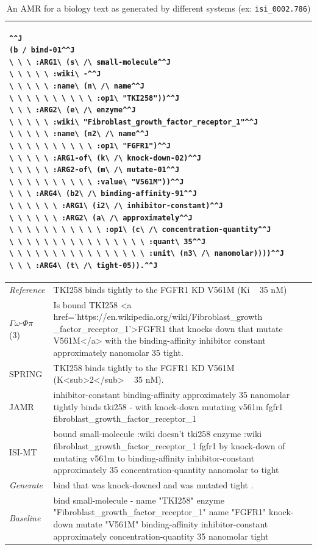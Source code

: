 \documentclass[12pt]{article}
\newcommand{\systeme}[1]{\textsc{#1}}
\newcommand{\gophipy}{$\Gamma\omega$-$\Phi\pi$}
\newcommand{\jamr}{\systeme{JAMR}}
\newcommand{\isimt}{\systeme{ISI-MT}}
\newcommand{\spring}{\systeme{SPRING}}
\newcommand{\representation}[1]{\textsf{#1}}
\newcommand{\AMR}{\representation{AMR}}
\begin{document}
\noindent
\begin{table}[ht]
\begin{tabular}{|p{1in}|p{5.25in}|}%
\hline
\multicolumn{2}{|p{6in}|}{
\begin{lstlisting}^^J
(b / bind-01^^J
\ \ \ :ARG1\ (s\ /\ small-molecule^^J
\ \ \ \ \ :wiki\ -^^J
\ \ \ \ \ :name\ (n\ /\ name^^J
\ \ \ \ \ \ \ \ \ \ :op1\ "TKI258"))^^J
\ \ \ :ARG2\ (e\ /\ enzyme^^J
\ \ \ \ \ :wiki\ "Fibroblast_growth_factor_receptor_1"^^J
\ \ \ \ \ :name\ (n2\ /\ name^^J
\ \ \ \ \ \ \ \ \ \ :op1\ "FGFR1")^^J
\ \ \ \ \ :ARG1-of\ (k\ /\ knock-down-02)^^J
\ \ \ \ \ :ARG2-of\ (m\ /\ mutate-01^^J
\ \ \ \ \ \ \ \ \ \ :value\ "V561M"))^^J
\ \ \ :ARG4\ (b2\ /\ binding-affinity-91^^J
\ \ \ \ \ \ :ARG1\ (i2\ /\ inhibitor-constant)^^J
\ \ \ \ \ \ :ARG2\ (a\ /\ approximately^^J
\ \ \ \ \ \ \ \ \ \ \ :op1\ (c\ /\ concentration-quantity^^J
\ \ \ \ \ \ \ \ \ \ \ \ \ \ \ \ :quant\ 35^^J
\ \ \ \ \ \ \ \ \ \ \ \ \ \ \ \ :unit\ (n3\ /\ nanomolar))))^^J
\ \ \ :ARG4\ (t\ /\ tight-05)).^^J
\end{lstlisting}
}\\\hline
\emph{Reference}&  TKI258 binds tightly to the FGFR1 KD V561M (Ki ~ 35 nM)\\\hline
\gophipy{} (3)&{\raggedright Is bound TKI258 \textless{}a href='https://en.wikipedia.org/wiki/Fibroblast\_growth \_factor\_receptor\_1'\textgreater{}FGFR1 that knocks down that mutate V561M\textless{}/a\textgreater{} with the binding-affinity inhibitor constant approximately nanomolar 35 tight.}\\\hline
\spring{}&TKI258 binds tightly to the FGFR1 KD V561M (K\textless{}sub\textgreater{}2\textless{}/sub\textgreater{} ~ 35 nM).\\ \hline
\jamr{}&inhibitor-constant binding-affinity approximately 35 nanomolar tightly binds tki258 - with knock-down mutating v561m fgfr1 fibroblast\_growth\_factor\_receptor\_1\\\hline
\isimt{}&bound small-molecule :wiki doesn't tki258 enzyme :wiki fibroblast\_growth\_factor\_receptor\_1 fgfr1 by knock-down of mutating v561m to binding-affinity inhibitor-constant approximately 35 concentration-quantity nanomolar to tight\\\hline
\emph{Generate}& bind that was knock-downed and was mutated tight .\\\hline
\emph{Baseline}&bind small-molecule - name "TKI258" enzyme "Fibroblast\_growth\_factor\_receptor\_1" name "FGFR1" knock-down mutate "V561M" binding-affinity inhibitor-constant approximately concentration-quantity 35 nanomolar tight\\
\hline
\end{tabular}
\caption{An \AMR{} for a biology text as generated by different systems (ex: \texttt{isi\_0002.786})}
\label{ex:isi_0002.786}
\end{table}
\end{document}
